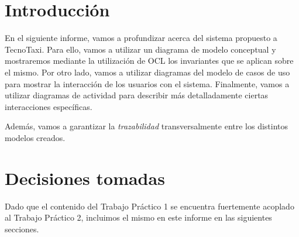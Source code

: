 \documentclass[a4paper, 10pt, twoside]{article}
\begin{document}
\newpage




\tableofcontents

\newpage




\section{Introducción}

En el siguiente informe, vamos a profundizar acerca del sistema propuesto a TecnoTaxi. Para ello, vamos a utilizar un diagrama de modelo conceptual y mostraremos mediante la utilización de OCL los invariantes que se aplican sobre el mismo. Por otro lado, vamos a utilizar diagramas del modelo de casos de uso para mostrar la interacción de los usuarios con el sistema. Finalmente, vamos a utilizar diagramas de actividad para describir más detalladamente ciertas interacciones específicas.

Además, vamos a garantizar la \emph{trazabilidad} transversalmente entre los distintos modelos creados.



\section{Decisiones tomadas}

Dado que el contenido del Trabajo Práctico 1 se encuentra fuertemente acoplado al Trabajo Práctico 2, incluimos el mismo en este informe en las siguientes secciones.

% 
\end{document}
